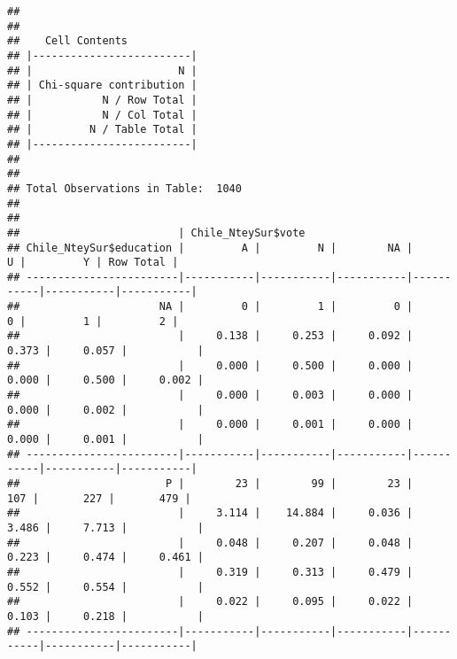 \documentclass[
]{article}
\newenvironment{Shaded}{\begin{snugshade}}{\end{snugshade}}
\newcommand{\FunctionTok}[1]{\textcolor[rgb]{0.00,0.00,0.00}{#1}}
\newcommand{\NormalTok}[1]{#1}
\newcommand{\OtherTok}[1]{\textcolor[rgb]{0.56,0.35,0.01}{#1}}
\newcommand{\SpecialCharTok}[1]{\textcolor[rgb]{0.00,0.00,0.00}{#1}}
\newcommand{\StringTok}[1]{\textcolor[rgb]{0.31,0.60,0.02}{#1}}
\begin{document}
\begin{Shaded}
\end{Shaded}

\begin{verbatim}
## 
##  
##    Cell Contents
## |-------------------------|
## |                       N |
## | Chi-square contribution |
## |           N / Row Total |
## |           N / Col Total |
## |         N / Table Total |
## |-------------------------|
## 
##  
## Total Observations in Table:  1040 
## 
##  
##                         | Chile_NteySur$vote 
## Chile_NteySur$education |         A |         N |        NA |         U |         Y | Row Total | 
## ------------------------|-----------|-----------|-----------|-----------|-----------|-----------|
##                      NA |         0 |         1 |         0 |         0 |         1 |         2 | 
##                         |     0.138 |     0.253 |     0.092 |     0.373 |     0.057 |           | 
##                         |     0.000 |     0.500 |     0.000 |     0.000 |     0.500 |     0.002 | 
##                         |     0.000 |     0.003 |     0.000 |     0.000 |     0.002 |           | 
##                         |     0.000 |     0.001 |     0.000 |     0.000 |     0.001 |           | 
## ------------------------|-----------|-----------|-----------|-----------|-----------|-----------|
##                       P |        23 |        99 |        23 |       107 |       227 |       479 | 
##                         |     3.114 |    14.884 |     0.036 |     3.486 |     7.713 |           | 
##                         |     0.048 |     0.207 |     0.048 |     0.223 |     0.474 |     0.461 | 
##                         |     0.319 |     0.313 |     0.479 |     0.552 |     0.554 |           | 
##                         |     0.022 |     0.095 |     0.022 |     0.103 |     0.218 |           | 
## ------------------------|-----------|-----------|-----------|-----------|-----------|-----------|

\end{verbatim}
\end{document}
